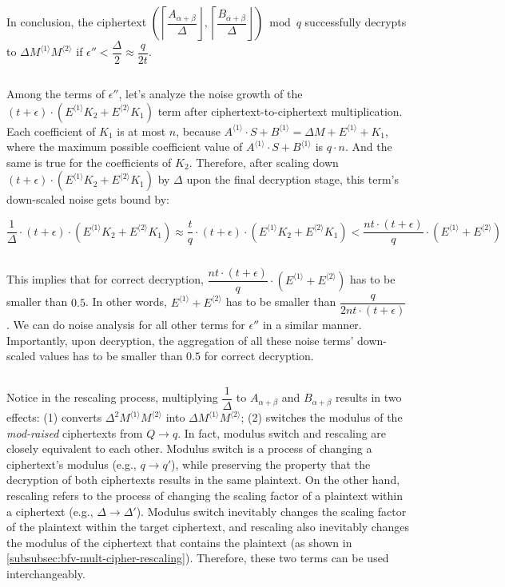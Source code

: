 $ $

In conclusion, the ciphertext $\left(\left\lceil\dfrac{A_{\alpha+\beta}}{\Delta}\right\rfloor, \left\lceil\dfrac{B_{\alpha+\beta}}{\Delta}\right\rfloor\right) \bmod q$ successfully decrypts to $\Delta M^{\langle 1 \rangle}M^{\langle 2 \rangle}$ if $\epsilon'' < \dfrac{\Delta}{2} \approx \dfrac{q}{2t}$. 

$ $

 Among the terms of $\epsilon''$, let's analyze the noise growth of the $(t + \epsilon)\cdot(E^{\langle 1 \rangle}K_2 + E^{\langle 2 \rangle}K_1)$ term after ciphertext-to-ciphertext multiplication. Each coefficient of $K_1$ is at most $n$, because $A^{\langle 1 \rangle}\cdot S + B^{\langle 1 \rangle} = \Delta M + E^{\langle 1 \rangle} + K_1$, where the maximum possible coefficient value of $A^{\langle 1 \rangle}\cdot S + B^{\langle 1 \rangle}$ is $q\cdot n$. And the same is true for the coefficients of $K_2$. Therefore, after scaling down $(t + \epsilon)\cdot(E^{\langle 1 \rangle}K_2 + E^{\langle 2 \rangle}K_1)$ by $\Delta$ upon the final decryption stage, this term's down-scaled noise gets bound by: 

$\dfrac{1}{\Delta}\cdot(t + \epsilon)\cdot(E^{\langle 1 \rangle}K_2 + E^{\langle 2 \rangle}K_1) \approx \dfrac{t}{q}\cdot(t + \epsilon)\cdot(E^{\langle 1 \rangle}K_2 + E^{\langle 2 \rangle}K_1) < \dfrac{nt \cdot (t + \epsilon)}{q} \cdot (E^{\langle 1 \rangle} + E^{\langle 2 \rangle})$

$ $

This implies that for correct decryption, $\dfrac{nt \cdot (t + \epsilon)}{q} \cdot (E^{\langle 1 \rangle} + E^{\langle 2 \rangle})$ has to be smaller than $0.5$. In other words, $E^{\langle 1 \rangle} + E^{\langle 2 \rangle}$ has to be smaller than $\dfrac{q}{2nt \cdot (t + \epsilon)}$. We can do noise analysis for all other terms for $\epsilon''$ in a similar manner. Importantly, upon decryption, the aggregation of all these noise terms' down-scaled values has to be smaller than $0.5$ for correct decryption. 

$ $

Notice in the rescaling process, multiplying $\dfrac{1}{\Delta}$ to $A_{\alpha + \beta}$ and $B_{\alpha + \beta}$ results in two effects: (1) converts $\Delta^2 M^{\langle 1 \rangle} M^{\langle 2 \rangle}$ into $\Delta M^{\langle 1 \rangle}  M^{\langle 2 \rangle}$; (2) switches the modulus of the \textit{mod-raised} ciphertexts from $Q \rightarrow q$. 
In fact, modulus switch and rescaling are closely equivalent to each other. Modulus switch is a process of changing a ciphertext's modulus (e.g., $q \rightarrow q'$), while preserving the property that the decryption of both ciphertexts results in the same plaintext. On the other hand, rescaling refers to the process of changing the scaling factor of a plaintext within a ciphertext (e.g., $\Delta \rightarrow \Delta'$). Modulus switch inevitably changes the scaling factor of the plaintext within the target ciphertext, and rescaling also inevitably changes the modulus of the ciphertext that contains the plaintext (as shown in \autoref{subsubsec:bfv-mult-cipher-rescaling}). Therefore, these two terms can be used interchangeably. 


